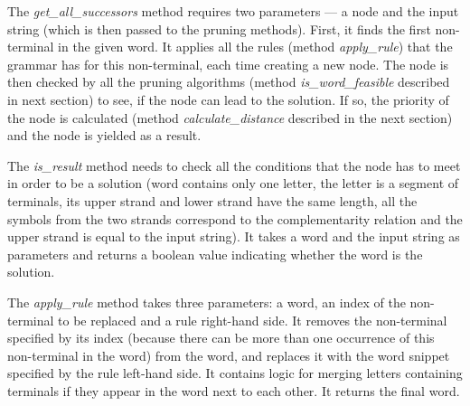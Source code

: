 The \textit{get\_all\_successors} method requires two parameters --- a node and the input string (which is then passed to the pruning methods). First, it finds the first non-terminal in the given word. It applies all the rules (method \textit{apply\_rule}) that the grammar has for this non-terminal, each time creating a new node. The node is then checked by all the pruning algorithms (method \textit{is\_word\_feasible} described in next section) to see, if the node can lead to the solution. If so, the priority of the node is calculated (method \textit{calculate\_distance} described in the next section) and the node is yielded as a result.

The \textit{is\_result} method needs to check all the conditions that the node has to meet in order to be a solution (word contains only one letter, the letter is a segment of terminals, its upper strand and lower strand have the same length, all the symbols from the two strands correspond to the complementarity relation and the upper strand is equal to the input string). It takes a word and the input string as parameters and returns a boolean value indicating whether the word is the solution.

The \textit{apply\_rule} method takes three parameters: a word, an index of the non-terminal to be replaced and a rule right-hand side. It removes the non-terminal specified by its index (because there can be more than one occurrence of this non-terminal in the word) from the word, and replaces it with the word snippet specified by the rule left-hand side. It contains logic for merging letters containing terminals if they appear in the word next to each other. It returns the final word.

